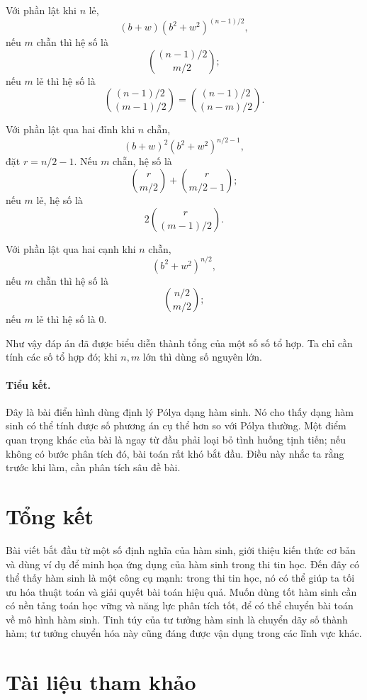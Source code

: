 \documentclass[11pt]{article}
\newcommand{\C}[2]{\binom{#1}{#2}}
\begin{document}
Với phần lật khi \(n\) lẻ,
\[
  (b+w)(b^2+w^2)^{(n-1)/2},
\]
nếu \(m\) chẵn thì hệ số là
\[
  \C{(n-1)/2}{m/2};
\]
nếu \(m\) lẻ thì hệ số là
\[
  \C{(n-1)/2}{(m-1)/2}
  =\C{(n-1)/2}{(n-m)/2}.
\]

Với phần lật qua hai đỉnh khi \(n\) chẵn,
\[
  (b+w)^2(b^2+w^2)^{n/2-1},
\]
đặt \(r=n/2-1\). Nếu \(m\) chẵn, hệ số là
\[
  \C{r}{m/2}+\C{r}{m/2-1};
\]
nếu \(m\) lẻ, hệ số là
\[
  2\C{r}{(m-1)/2}.
\]

Với phần lật qua hai cạnh khi \(n\) chẵn,
\[
  (b^2+w^2)^{n/2},
\]
nếu \(m\) chẵn thì hệ số là
\[
  \C{n/2}{m/2};
\]
nếu \(m\) lẻ thì hệ số là \(0\).

Như vậy đáp án đã được biểu diễn thành tổng của một số số tổ hợp. Ta chỉ cần
tính các số tổ hợp đó; khi \(n,m\) lớn thì dùng số nguyên lớn.

\paragraph{Tiểu kết.}
Đây là bài điển hình dùng định lý Pólya dạng hàm sinh. Nó cho thấy dạng hàm
sinh có thể tính được số phương án cụ thể hơn so với Pólya thường. Một điểm
quan trọng khác của bài là ngay từ đầu phải loại bỏ tình huống tịnh tiến; nếu
không có bước phân tích đó, bài toán rất khó bắt đầu. Điều này nhắc ta rằng
trước khi làm, cần phân tích sâu đề bài.

\section{Tổng kết}

Bài viết bắt đầu từ một số định nghĩa của hàm sinh, giới thiệu kiến thức cơ
bản và dùng ví dụ để minh họa ứng dụng của hàm sinh trong thi tin học. Đến
đây có thể thấy hàm sinh là một công cụ mạnh: trong thi tin học, nó có thể
giúp ta tối ưu hóa thuật toán và giải quyết bài toán hiệu quả. Muốn dùng tốt
hàm sinh cần có nền tảng toán học vững và năng lực phân tích tốt, để có thể
chuyển bài toán về mô hình hàm sinh. Tinh túy của tư tưởng hàm sinh là chuyển
dãy số thành hàm; tư tưởng chuyển hóa này cũng đáng được vận dụng trong các
lĩnh vực khác.

\section*{Tài liệu tham khảo}
\end{document}
